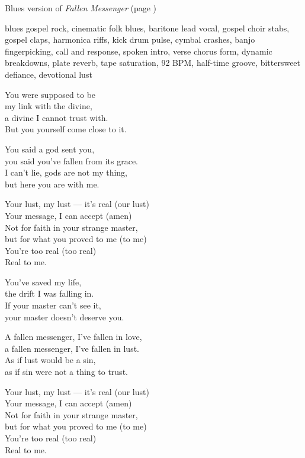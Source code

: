 
\begin{notes}
Blues version of \emph{Fallen Messenger} (page \pageref{sec:fallen-messenger})
\end{notes}
\begin{style}
blues gospel rock, cinematic folk blues, baritone lead vocal, gospel choir stabs, gospel claps, harmonica riffs, kick drum pulse, cymbal crashes, banjo fingerpicking, call and response, spoken intro, verse chorus form, dynamic breakdowns, plate reverb, tape saturation, 92 BPM, half-time groove, bittersweet defiance, devotional lust
\end{style}
\begin{lyrics}

You were supposed to be\\
my link with the divine,\\
a divine I cannot trust with.\\
But you yourself come close to it.

You said a god sent you,\\
you said you’ve fallen from its grace.\\
I can’t lie, gods are not my thing,\\
but here you are with me.

Your lust, my lust — it’s real (our lust)\\
Your message, I can accept (amen)\\
Not for faith in your strange master,\\
but for what you proved to me (to me)\\
You’re too real (too real)\\
Real to me.

You’ve saved my life,\\
the drift I was falling in.\\
If your master can’t see it,\\
your master doesn’t deserve you.

A fallen messenger, I’ve fallen in love,\\
a fallen messenger, I’ve fallen in lust.\\
As if lust would be a sin,\\
as if sin were not a thing to trust.

Your lust, my lust — it’s real (our lust)\\
Your message, I can accept (amen)\\
Not for faith in your strange master,\\
but for what you proved to me (to me)\\
You’re too real (too real)\\
Real to me.


\end{lyrics}
